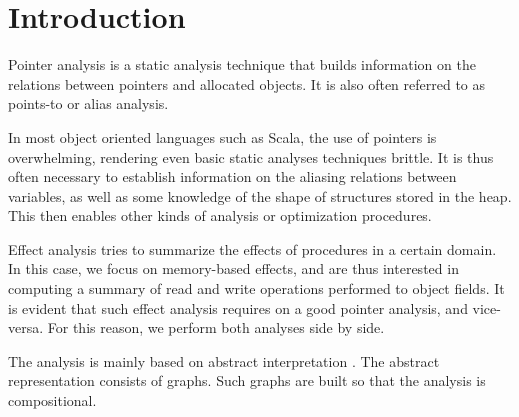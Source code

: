 \chapter{Introduction} \label{chap:intro}
Pointer analysis is a static analysis technique that builds information on the
relations between pointers and allocated objects. It is also often referred to
as points-to or alias analysis.

In most object oriented languages such as Scala, the use of pointers is
overwhelming, rendering even basic static analyses techniques brittle. It is
thus often necessary to establish information on the aliasing relations between
variables, as well as some knowledge of the shape of structures stored in the
heap. This then enables other kinds of analysis or optimization procedures.

Effect analysis tries to summarize the effects of procedures in a certain
domain. In this case, we focus on memory-based effects, and are thus interested
in computing a summary of read and write operations performed to object fields.
It is evident that such effect analysis requires on a good pointer analysis,
and vice-versa. For this reason, we perform both analyses side by side.

The analysis is mainly based on abstract interpretation
\cite{DBLP:conf/popl/CousotC77,DBLP:conf/popl/CousotC02}. The abstract
representation consists of graphs. Such graphs are built so that the analysis
is compositional.

